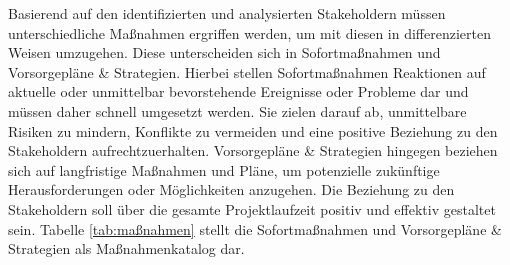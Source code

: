 Basierend auf den identifizierten und analysierten Stakeholdern müssen unterschiedliche Maßnahmen ergriffen werden, um mit diesen in differenzierten Weisen umzugehen. Diese unterscheiden sich in Sofortmaßnahmen und Vorsorgepläne \& Strategien. Hierbei stellen Sofortmaßnahmen Reaktionen auf aktuelle oder unmittelbar bevorstehende Ereignisse oder Probleme dar und müssen daher schnell umgesetzt werden. Sie zielen darauf ab, unmittelbare Risiken zu mindern, Konflikte zu vermeiden und eine positive Beziehung zu den Stakeholdern aufrechtzuerhalten. Vorsorgepläne \& Strategien hingegen beziehen sich auf langfristige Maßnahmen und Pläne, um potenzielle zukünftige Herausforderungen oder Möglichkeiten anzugehen. Die Beziehung zu den Stakeholdern soll über die gesamte Projektlaufzeit positiv und effektiv gestaltet sein. Tabelle \ref{tab:maßnahmen} stellt die Sofortmaßnahmen und Vorsorgepläne \& Strategien als Maßnahmenkatalog dar.
\vspace{10pt}

